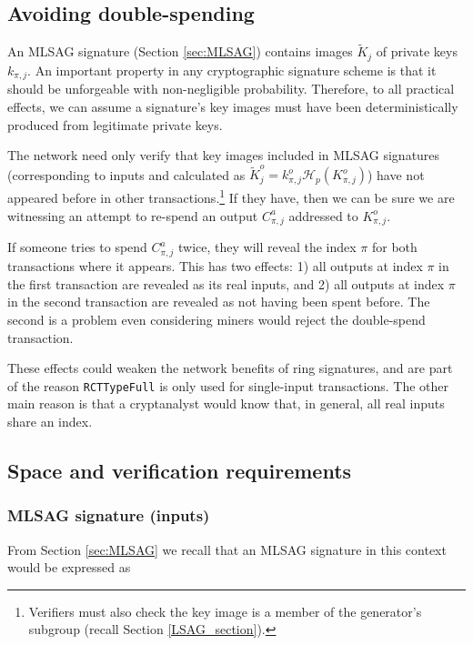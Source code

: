 \subsection{Avoiding double-spending}

An MLSAG signature (Section \ref{sec:MLSAG}) contains images \(\tilde{K}_{j}\) of private keys \(k_{\pi, j}\). An important property in any cryptographic signature scheme is that it should be unforgeable with non-negligible probability. Therefore, to all practical effects, we can assume a signature’s key images must have been deterministically produced from legitimate private keys.
	
The network need only verify that key images included in MLSAG signatures (corresponding to inputs and calculated as $\tilde{K}^o_{j} = k^o_{\pi,j} \mathcal{H}_p(K^o_{\pi,j})$) have not appeared before in other transactions.\footnote{Verifiers must also check the key image is a member of the generator's subgroup (recall Section \ref{LSAG_section}).} If they have, then we can be sure we are witnessing an attempt to re-spend an output $C^a_{\pi,j}$ addressed to $K_{\pi,j}^o$.

If someone tries to spend $C^a_{\pi,j}$ twice, they will reveal the index $\pi$ for both transactions where it appears. This has two effects: 1) all outputs at index $\pi$ in the first transaction are revealed as its real inputs, and 2) all outputs at index $\pi$ in the second transaction are revealed as not having been spent before. The second is a problem even considering miners would reject the double-spend transaction.

These effects could weaken the network benefits of ring signatures, and are part of the reason {\tt RCTTypeFull} is only used for single-input transactions. The other main reason is that a cryptanalyst would know that, in general, all real inputs share an index.


\subsection{Space and verification requirements}
\label{subsec:space-and-ver-rcttypefull}

\subsubsection*{MLSAG signature (inputs)}

From Section \ref{sec:MLSAG} we recall that an MLSAG signature in this context would be expressed as

